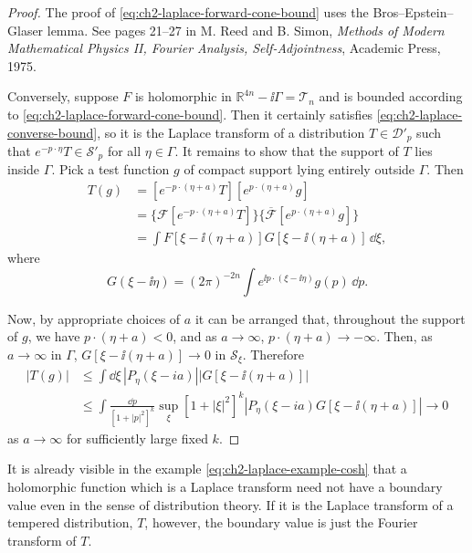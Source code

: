 \begin{proof}
The proof of \eqref{eq:ch2-laplace-forward-cone-bound} uses the Bros--Epstein--Glaser lemma.  See pages 21--27
in M. Reed and B. Simon, \emph{Methods of Modern Mathematical Physics II,
Fourier Analysis, Self-Adjointness}, Academic Press, 1975.

Conversely, suppose $F$ is holomorphic in $\mathbb{R}^{4n}-\ii\Gamma=\mathcal{T}_n$
and is bounded according to \eqref{eq:ch2-laplace-forward-cone-bound}.  Then it certainly satisfies \eqref{eq:ch2-laplace-converse-bound}, so
it is the Laplace transform of a distribution $T\in\mathcal{D}'_p$ such
that $e^{-p\cdot\eta}T\in\mathcal{S}'_p$ for all $\eta\in\Gamma$.  It
remains to show that the support of $T$ lies inside $\Gamma$.  Pick a test
function $g$ of compact support lying entirely outside $\Gamma$.  Then
\begin{align*}
  T(g)
  &=[e^{-p\cdot(\eta+a)}T][e^{p\cdot(\eta+a)}g] \\
  &=\{\mathcal{F}[e^{-p\cdot(\eta+a)}T]\}
    \{\overline{\mathcal{F}}[e^{p\cdot(\eta+a)}g]\} \\
  &=\int F[\xi-\ii(\eta+a)]G[\xi-\ii(\eta+a)]\,\dd\xi,
\end{align*}
where
\begin{equation*}
  G(\xi-\ii\eta)=(2\pi)^{-2n}
  \int e^{\ii p\cdot(\xi-\ii\eta)}g(p)\,\dd p .
\end{equation*}

Now, by appropriate choices of $a$ it can be arranged that, throughout the
support of $g$, we have $p\cdot(\eta+a)<0$, and as $a\to\infty$,
$p\cdot(\eta+a)\to-\infty$.  Then, as $a\to\infty$ in $\Gamma$,
$G[\xi-\ii(\eta+a)]\to0$ in $\mathcal{S}_\xi$.  Therefore
\begin{align*}
  |T(g)|
  &\leq\int \dd\xi\,|P_\eta(\xi-ia)|
    |G[\xi-\ii(\eta+a)]| \\
  &\leq\int\frac{\dd p}{[1+|p|^2]^k}
    \sup_\xi[1+|\xi|^2]^k
    |P_\eta(\xi-ia)G[\xi-\ii(\eta+a)]|\longrightarrow0
\end{align*}
as $a\to\infty$ for sufficiently large fixed $k$.
\end{proof}

It is already visible in the example \eqref{eq:ch2-laplace-example-cosh} that a holomorphic function
which is a Laplace transform need not have a boundary value even in the
sense of distribution theory.  If it is the Laplace transform of a
tempered distribution, $T$, however, the boundary value is just the
Fourier transform of $T$.

